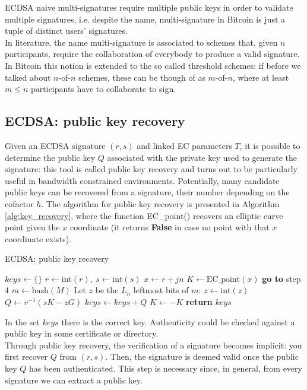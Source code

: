\bigskip
\noindent
ECDSA naive multi-signatures require multiple public keys in order to validate multiple signatures, i.e. despite the name, multi-signature in Bitcoin is just a tuple of distinct users' signatures.
\\
In literature, the name multi-signature is associated to schemes that, given $n$ participants, require the collaboration of everybody to produce a valid signature. In Bitcoin this notion is extended to the so called threshold schemes: if before we talked about $n$-of-$n$ schemes, these can be though of as $m$-of-$n$, where at least $m \leq n$ participants have to collaborate to sign.

\bigskip

\subsection{ECDSA: public key recovery}
Given an ECDSA signature $(r, s)$ and linked EC parameters $T$, it is possible to determine the public key $Q$ associated with the private key used to generate the signature: this tool is called public key recovery and turns out to be particularly useful in bandwidth constrained environments. Potentially, many candidate public keys can be recovered from a signature, their number depending on the cofactor $h$. The algorithm for public key recovery is presented in Algorithm \ref{alg:key_recovery}, where the function EC\_point() recovers an elliptic curve point given the $x$ coordinate (it returns \textbf{False} in case no point with that $x$ coordinate exists).

\bigskip

\begin{algorithm}
	\caption{ECDSA: public key recovery}
	\label{alg:key_recovery}
	\begin{algorithmic}[1]
		\State $keys \gets \{\}$
		\State $r \gets \text{int}(r), \ s \gets \text{int}(s)$
		\State $x \gets r + jn$
		\State $K \gets \text{EC\_point}(x)$
		\State \textbf{go to} step 4
		\EndIf
		\State $m \gets \text{hash}(M)$
		\State Let $z$ be the $L_n$ leftmost bits of $m$: $z \gets \text{int}(z)$
		\State $Q \gets r^{-1}(sK - zG)$
		\State $keys \gets keys + Q$
		\State $K \gets -K$
		\EndFor
		\EndFor
		\State \textbf{return} $keys$
		\EndProcedure
	\end{algorithmic}
\end{algorithm}
\noindent
In the set $keys$ there is the correct key. Authenticity could be checked against a public key in some certificate or directory.
\\
Through public key recovery, the verification of a signature becomes implicit: you first recover $Q$ from $(r, s)$. Then, the signature is deemed valid once the public key $Q$ has been authenticated. This step is necessary since, in general, from every signature we can extract a public key.

